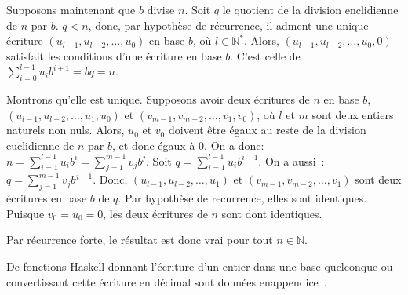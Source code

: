 Supposons maintenant que $b$ divise $n$. 
Soit $q$ le quotient de la division enclidienne de $n$ par $b$. 
$q < n$, donc, par hypothèse de récurrence, il adment une unique écriture $(u_{l-1}, u_{l-2}, \dots, u_0)$ en base $b$, où $l \in \mathbb{N}^*$. 
Alors, $(u_{l-1}, u_{l-2}, \dots, u_0, 0)$ satisfait les conditions d'une écriture en base $b$. 
C'est celle de $\sum_{i=0}^{l-1} u_i b^{i+1} = b q = n$. 

Montrons qu'elle est unique. 
Supposons avoir deux écritures de $n$ en base $b$, $(u_{l-1}, u_{l-2}, \dots, u_1, u_0)$ et $(v_{m-1}, v_{m-2}, \dots, v_1, v_0)$, où $l$ et $m$ sont deux entiers naturels non nuls. 
Alors, $u_0$ et $v_0$ doivent être égaux au reste de la division euclidienne de $n$ par $b$, et donc égaux à $0$. 
On a donc: $n = \sum_{i=1}^{l-1} u_i b^{i} = \sum_{j=1}^{m-1} v_j b^{j}$. 
Soit $q = \sum_{i=1}^{l-1} u_i b^{i-1}$. 
On a aussi : $q = \sum_{j=1}^{m-1} v_j b^{j-1}$. 
Donc, $(u_{l-1}, u_{l-2}, \dots, u_1)$ et $(v_{m-1}, v_{m-2}, \dots, v_1)$ sont deux écritures en base $b$ de $q$. 
Par hypothèse de recurrence, elles sont identiques. 
Puisque $v_0 = u_0 = 0$, les deux écritures de $n$ sont dont identiques. 

Par récurrence forte, le résultat est donc vrai pour tout $n \in \mathbb{N}$.

\done

\bigskip

De fonctions Haskell donnant l'écriture d'un entier dans une base quelconque ou convertissant cette écriture en décimal sont données enappendice~\label{app:Haskell_baseb}.

